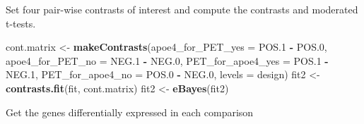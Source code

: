 \documentclass[]{article}
\newenvironment{Shaded}{\begin{snugshade}}{\end{snugshade}}
\newcommand{\KeywordTok}[1]{\textcolor[rgb]{0.13,0.29,0.53}{\textbf{#1}}}
\newcommand{\DataTypeTok}[1]{\textcolor[rgb]{0.13,0.29,0.53}{#1}}
\newcommand{\DecValTok}[1]{\textcolor[rgb]{0.00,0.00,0.81}{#1}}
\newcommand{\StringTok}[1]{\textcolor[rgb]{0.31,0.60,0.02}{#1}}
\newcommand{\CommentTok}[1]{\textcolor[rgb]{0.56,0.35,0.01}{\textit{#1}}}
\newcommand{\OperatorTok}[1]{\textcolor[rgb]{0.81,0.36,0.00}{\textbf{#1}}}
\newcommand{\NormalTok}[1]{#1}
\begin{document}
\begin{Shaded}
\end{Shaded}

Set four pair-wise contrasts of interest and compute the contrasts and
moderated t-tests.

\begin{Shaded}
\begin{Highlighting}[]
\NormalTok{cont.matrix <-}\StringTok{ }\KeywordTok{makeContrasts}\NormalTok{(}\DataTypeTok{apoe4_for_PET_yes =}\NormalTok{ POS.}\DecValTok{1} \OperatorTok{-}\StringTok{ }\NormalTok{POS.}\DecValTok{0}\NormalTok{,}
                             \DataTypeTok{apoe4_for_PET_no =}\NormalTok{ NEG.}\DecValTok{1} \OperatorTok{-}\StringTok{ }\NormalTok{NEG.}\DecValTok{0}\NormalTok{,}
                             \DataTypeTok{PET_for_apoe4_yes =}\NormalTok{ POS.}\DecValTok{1} \OperatorTok{-}\StringTok{ }\NormalTok{NEG.}\DecValTok{1}\NormalTok{,}
                             \DataTypeTok{PET_for_apoe4_no =}\NormalTok{ POS.}\DecValTok{0} \OperatorTok{-}\StringTok{ }\NormalTok{NEG.}\DecValTok{0}\NormalTok{,}
                             \DataTypeTok{levels =}\NormalTok{ design)}
\NormalTok{fit2 <-}\StringTok{ }\KeywordTok{contrasts.fit}\NormalTok{(fit, cont.matrix)}
\NormalTok{fit2 <-}\StringTok{ }\KeywordTok{eBayes}\NormalTok{(fit2)}
\end{Highlighting}
\end{Shaded}

Get the genes differentially expressed in each comparison
\end{document}
